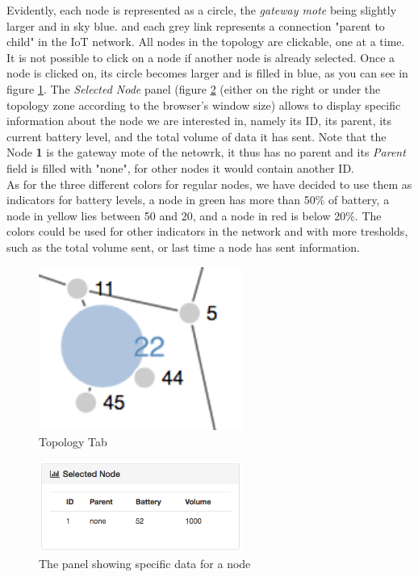 Evidently, each node is represented as a circle, the \textit{gateway mote} being slightly larger and in sky blue. and each grey link represents a connection "parent to child" in the IoT network. All nodes in the topology are clickable, one at a time. It is not possible to click on a node if another node is already selected. Once a node is clicked on, its circle becomes larger and is filled in blue, as you can see in figure \ref{fig:snodeblue}. The \textit{Selected Node} panel (figure \ref{fig:snode} (either on the right or under the topology zone according to the browser's window size) allows to display specific information about the node we are interested in, namely its ID, its parent, its current battery level, and the total volume of data it has sent. Note that the Node \textbf{1} is the gateway mote of the netowrk, it thus has no parent and its \textit{Parent} field is filled with "none", for other nodes it would contain another ID.\\

As for the three different colors for regular nodes, we have decided to use them as indicators for battery levels, a node in green has more than 50\% of battery, a node in yellow lies between 50 and 20, and a node in red is below 20\%. The colors could be used for other indicators in the network and with more tresholds, such as the total volume sent, or last time a node has sent information.\\

\begin{figure}[!h]
	\centering
	\includegraphics[width=0.6\textwidth]{res/snodeblue.png}
	\caption{Topology Tab}
	\label{fig:snodeblue}
\end{figure}


\begin{figure}[!h]
	\centering
	\includegraphics[width=0.6\textwidth]{res/snode.png}
	\caption{The panel showing specific data for a node}
	\label{fig:snode}
\end{figure}



